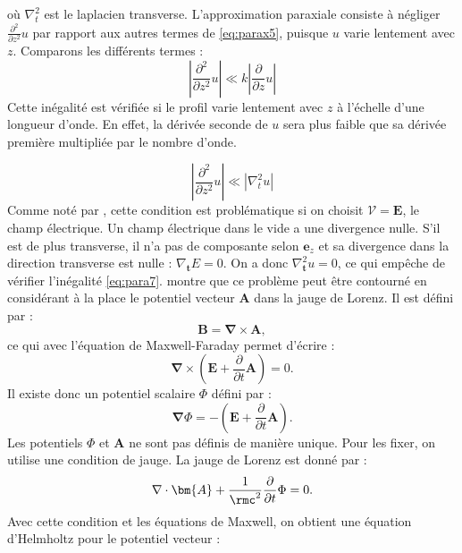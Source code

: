 où $\nabla_t^2$ est le laplacien transverse. L'approximation paraxiale consiste à négliger $\frac{\partial^2}{\partial z^2} u$ par rapport aux autres termes de \ref{eq:parax5}, puisque $u$ varie lentement avec $z$. Comparons les différents termes :
\begin{equation}
\left|\frac{\partial^2}{\partial z^2} u\right|\ll k\left| \frac{\partial}{\partial z} u\right|
\label{eq:para6}
\end{equation}
Cette inégalité est vérifiée si le profil varie lentement avec $z$ à l'échelle d'une longueur d'onde. En effet, la dérivée seconde de $u$ sera plus faible que sa dérivée première multipliée par le nombre d'onde.

\begin{equation}
\left|\frac{\partial^2}{\partial z^2} u\right|\ll\left|\nabla_t^2 u \right|
\label{eq:para7}
\end{equation}
Comme noté par , cette condition est problématique si on choisit $\bm{\mathcal{V}}=\bm{E}$, le champ électrique. Un champ électrique dans le vide a une divergence nulle. S'il est de plus transverse, il n'a pas de composante selon $\bm{e}_z$ et sa divergence dans la direction transverse est nulle : $\nabla_{\bm{t}} E=0$. On a donc $\nabla_{\bm{t}}^2 u=0$, ce qui empêche de vérifier l'inégalité \ref{eq:para7}.  montre que ce problème peut être contourné en considérant à la place le potentiel vecteur $\bm{A}$ dans la jauge de Lorenz. Il est défini par :
\begin{equation}
\bm{B} = \bm{\nabla}\times\bm{A},
\label{eq:para8}
\end{equation}
ce qui avec l'équation de Maxwell-Faraday permet d'écrire : 
\begin{equation}
\bm{\nabla}\times\left(\bm{E}+\frac{\partial}{\partial t}\bm{A}\right) = 0.
\label{eq:para9}
\end{equation}
Il existe donc un potentiel scalaire $\Phi$ défini par :
\begin{equation}
\bm{\nabla}\Phi=-\left(\bm{E}+\frac{\partial}{\partial t}\bm{A}\right).
\label{eq:para10}
\end{equation}
Les potentiels $\Phi$ et $\bm{A}$ ne sont pas définis de manière unique. Pour les fixer, on utilise une condition de jauge. La jauge de Lorenz est donné par :
\begin{equation}
\nabla\cdot\bm{A}+\frac{1}{\rmc^2}\frac{\partial}{\partial t}\Phi=0.
\label{eq:para11}
\end{equation}
Avec cette condition et les équations de Maxwell, on obtient une équation d'Helmholtz pour le potentiel vecteur :
